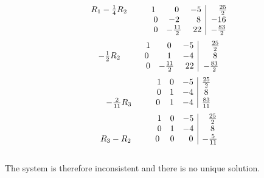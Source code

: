 \documentclass[12pt]{amsart}
\begin{document}
\begin{enumerate}
\begin{enumerate}
\begin{align}
			\end{align} 
			\smallskip
			\begin{align}
				\begin{array}{ccc|c}
					R_1-\frac{1}{4}R_2\hspace{1cm}1&\text{ }\text{ }0&-5&\text{ }\text{ }\text{ }\frac{25}{2} 					\\
					\hspace{2.7cm}0&-2&\text{ } \text{ }8&-16 \\
					\hspace{2.7cm} 0&-\frac{11}{2}&\text{ }22&-\frac{83}{2}
				\end{array} \notag
			\end{align} 
			\smallskip
			\begin{align}
				\begin{array}{ccc|c}
					\hspace{2.05cm}1&\text{ }\text{ }0&-5&\text{ }\text{ }\text{ }\frac{25}{2} \\
					-\frac{1}{2}R_2 \hspace{1cm}0&\text{ } \text{ }1&-4&\text{ } \text{ } \text{ } 8 \\
					\hspace{2.05cm} 0&-\frac{11}{2}&\text{ }22&-\frac{83}{2}
				\end{array} \notag
			\end{align} 
			\smallskip
			\begin{align}
				\begin{array}{ccc|c}
					\hspace{2.15cm}1&0&-5&\frac{25}{2} \\
					\hspace{2.15cm}0&1&-4&8 \\
					-\frac{2}{11}R_3 \hspace{1cm} 0&1&-4&\frac{83}{11}
				\end{array} \notag
			\end{align} 
			\begin{align}
				\begin{array}{ccc|c}
					\hspace{2.45cm}1&0&-5&\text{ }\text{ }\frac{25}{2} \\
					\hspace{2.45cm}0&1&-4&\text{ } \text{ } 8 \\
					R_3-R_2 \hspace{1cm} 0&0&\text{ } \text{ } 0&-\frac{5}{11}
				\end{array} \notag
			\end{align} 
			\\
		The system is therefore inconsistent and there is no unique solution. \\
	

\end{enumerate}
\end{enumerate}
\end{document}
